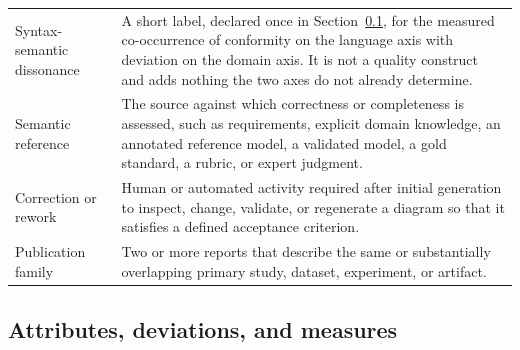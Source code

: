 \begin{longtable}{p{} p{}}
Syntax-semantic dissonance & A short label, declared once in Section~\ref{sec:protocol_attribute_deviation_measure}, for the measured co-occurrence of conformity on the language axis with deviation on the domain axis. It is not a quality construct and adds nothing the two axes do not already determine. \\
Semantic reference & The source against which correctness or completeness is assessed, such as requirements, explicit domain knowledge, an annotated reference model, a validated model, a gold standard, a rubric, or expert judgment. \\
Correction or rework & Human or automated activity required after initial generation to inspect, change, validate, or regenerate a diagram so that it satisfies a defined acceptance criterion. \\
Publication family & Two or more reports that describe the same or substantially overlapping primary study, dataset, experiment, or artifact. \\
\bottomrule
\end{longtable}

\subsection{Attributes, deviations, and measures}
\label{sec:protocol_attribute_deviation_measure}

